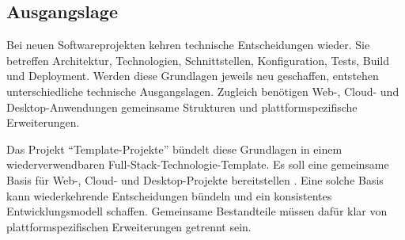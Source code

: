 \subsection{Ausgangslage}
\label{subsec:ausgangslage}

Bei neuen Softwareprojekten kehren technische Entscheidungen wieder. Sie
betreffen Architektur, Technologien, Schnittstellen, Konfiguration, Tests,
Build und Deployment.
Werden diese Grundlagen jeweils neu geschaffen, entstehen unterschiedliche
technische Ausgangslagen. Zugleich benötigen Web-, Cloud- und
Desktop-Anwendungen gemeinsame Strukturen und plattformspezifische
Erweiterungen.

Das Projekt \enquote{Template-Projekte} bündelt diese Grundlagen in einem
wiederverwendbaren Full-Stack-Technologie-Template. Es soll eine gemeinsame
Basis für Web-, Cloud- und Desktop-Projekte bereitstellen
\parencite{kleiveist2026governance-snapshot}.
Eine solche Basis kann wiederkehrende Entscheidungen bündeln und ein
konsistentes Entwicklungsmodell schaffen. Gemeinsame Bestandteile müssen dafür
klar von plattformspezifischen Erweiterungen getrennt sein.
